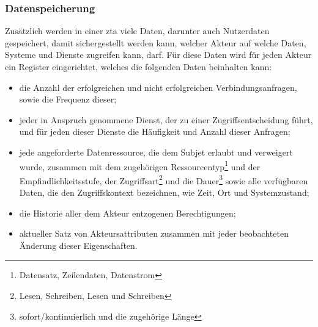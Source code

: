 \subsubsection{Datenspeicherung}\label{subsubsec:datenspeicherung}
Zusätzlich werden in einer \ac{zta} viele Daten, darunter auch Nutzerdaten gespeichert, damit sichergestellt werden kann, welcher Akteur auf welche Daten, Systeme und Dienste zugreifen kann, \bzw darf.
Für diese Daten wird für jeden Akteur ein Register eingerichtet, welches die folgenden Daten beinhalten kann\autocite[\vglf][]{colombo-2021}:
\begin{itemize}
    \item die Anzahl der erfolgreichen und nicht erfolgreichen Verbindungsanfragen, sowie die Frequenz dieser;
    \item jeder in Anspruch genommene Dienst, der zu einer Zugriffsentscheidung führt, und für jeden dieser Dienste die Häufigkeit und Anzahl dieser Anfragen;
    \item jede angeforderte Datenressource, die dem Subjet erlaubt und verweigert wurde, zusammen mit dem zugehörigen Ressourcentyp\footnote{\zb Datensatz, Zeilendaten, Datenstrom} und der Empfindlichkeitsstufe, der Zugriffsart\footnote{\zb Lesen, Schreiben, Lesen und Schreiben} und die Dauer\footnote{\zb sofort/kontinuierlich und die zugehörige Länge} sowie alle verfügbaren Daten, die den Zugriffskontext bezeichnen, wie \zb Zeit, Ort und Systemzustand;
    \item die Historie aller dem Akteur entzogenen Berechtigungen;
    \item aktueller Satz von Akteursattributen zusammen mit jeder beobachteten Änderung dieser Eigenschaften.
\end{itemize}

